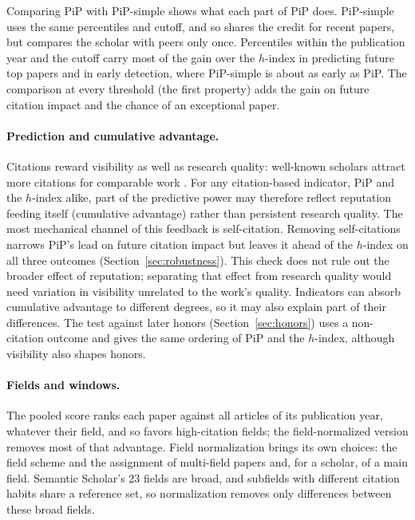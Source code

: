 \documentclass[11pt]{article}
\begin{document}
Comparing PiP with PiP-simple shows what each part of PiP does. PiP-simple uses the same percentiles and cutoff, and so
shares the credit for recent papers, but compares the scholar with peers only once. Percentiles within the publication
year and the cutoff carry most of the gain over the $h$-index in predicting future top papers and in early detection,
where PiP-simple is about as early as PiP. The comparison at every threshold (the first property) adds the gain on
future citation impact and the chance of an exceptional paper.

\paragraph{Prediction and cumulative advantage.} Citations reward visibility as well as research quality: well-known
scholars attract more citations for comparable work \citep{merton1968matthew,petersen2014reputation}. For any
citation-based indicator, PiP and the $h$-index alike, part of the predictive power may therefore reflect reputation
feeding itself (cumulative advantage) rather than persistent research quality. The most mechanical channel of this
feedback is self-citation. Removing self-citations narrows PiP's lead on future citation impact but leaves it ahead of
the $h$-index on all three outcomes (Section~\ref{sec:robustness}). This check does not rule out the broader effect of
reputation; separating that effect from research quality would need variation in visibility unrelated to the work's
quality. Indicators can absorb cumulative advantage to different degrees, so it may also explain part of their
differences. The test against later honors (Section~\ref{sec:honors}) uses a non-citation outcome and gives the same
ordering of PiP and the $h$-index, although visibility also shapes honors.

\paragraph{Fields and windows.} The pooled score ranks each paper against all articles of its publication year,
whatever their field, and so favors high-citation fields; the field-normalized version removes most of that advantage.
Field normalization brings its own choices: the field scheme and the assignment of multi-field papers
\citep{zitt2005relativity,waltman2015field,waltman2019field} and, for a scholar, of a main field. Semantic Scholar's 23
fields are broad, and subfields with different citation habits share a reference set, so normalization removes only
differences between these broad fields.
\end{document}
